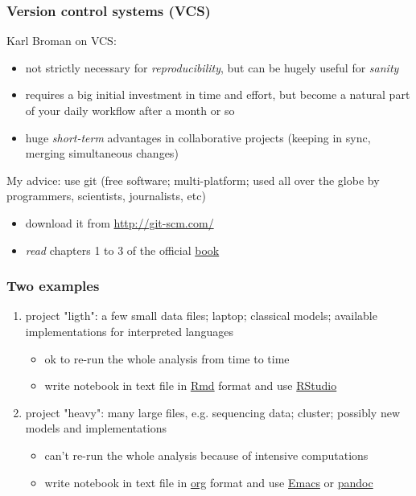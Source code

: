 \documentclass[c]{beamer} %
\begin{document}
\begin{frame}
  \frametitle{Version control systems (VCS)}
  Karl Broman on VCS:
  \begin{itemize}
  \item not strictly necessary for \emph{reproducibility}, but can be hugely useful for \emph{sanity}
  \item requires a big initial investment in time and effort, but become a natural part of your daily workflow after a month or so
  \item huge \emph{short-term} advantages in collaborative projects (keeping in sync, merging simultaneous changes)
  \end{itemize}
  
  \bigskip
  \pause
  
  My advice: use \alert{git} (free software; multi-platform; used all over the globe by programmers, scientists, journalists, etc)
  \begin{itemize}
  \item download it from \url{http://git-scm.com/}
  \item \emph{read} chapters 1 to 3 of the official \href{http://git-scm.com/book/en/v2}{book}
  \end{itemize}
\end{frame}

\begin{frame}[fragile]
  \frametitle{Two examples}
  \begin{enumerate}
  \item \alert{project "ligth"}: a few small data files; laptop; classical models; available implementations for interpreted languages
    \begin{itemize}
    \item ok to re-run the whole analysis from time to time
    \item write notebook in text file in \href{http://cran.r-project.org/web/packages/rmarkdown/index.html}{Rmd} format and use \href{http://www.rstudio.com/products/rstudio/download/}{RStudio}
    \end{itemize}
    \bigskip
    \pause
  \item \alert{project "heavy"}: many large files, e.g. sequencing data; cluster; possibly new models and implementations
    \begin{itemize}
    \item can't re-run the whole analysis because of intensive computations
    \item write notebook in text file in \href{http://orgmode.org/}{org} format and use \href{https://www.gnu.org/software/emacs/}{Emacs} or \href{http://johnmacfarlane.net/pandoc/}{pandoc}
    \end{itemize}
  \end{enumerate}
\end{frame}
\end{document}
